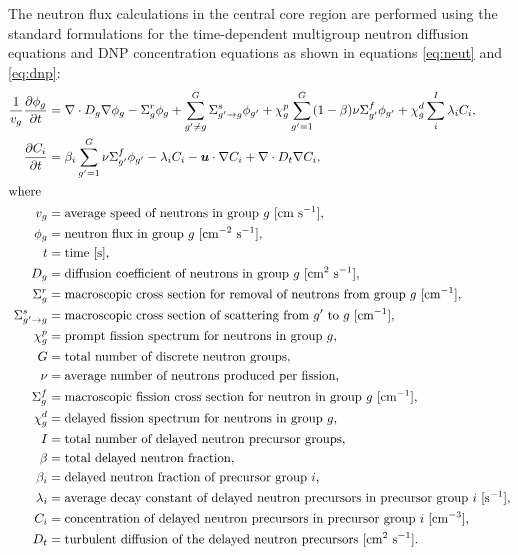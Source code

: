 The neutron flux calculations in the central core region are
performed using the standard formulations for the time-dependent multigroup
neutron diffusion equations and \gls{DNP} concentration equations as shown in
equations \ref{eq:neut} and \ref{eq:dnp}:
%
\begin{align}
    \frac{1}{v_g} \frac{\partial \phi_g}{\partial t} &= \nabla \cdot D_g
    \nabla \phi_g - \Sigma^r_g \phi_g +
    \sum^G_{g' \neq g} \Sigma^s_{g' \rightarrow g} \phi_{g'} + \chi^p_g
    \sum^G_{g'=1} (1-\beta) \nu \Sigma^f_{g'} \phi_{g'} + \chi^d_g \sum^I_i
    \lambda_i C_i, \label{eq:neut} \\
    \frac{\partial C_i}{\partial t} &= \beta_i \sum^G_{g'=1} \nu \Sigma^f_{g'}
    \phi_{g'} - \lambda_i C_i - \boldsymbol{u} \cdot \nabla C_i + \nabla \cdot
    D_t \nabla C_i, \label{eq:dnp} \\
    \intertext{where}
    v_g &= \text{average speed of neutrons in group $g$ [cm s$^{-1}$],} 
    \nonumber \\
    \phi_g &= \text{neutron flux in group $g$ [cm$^{-2}$ s$^{-1}$],} \nonumber
    \\
    t &= \text{time [s],} \nonumber \\
    D_g &= \text{diffusion coefficient of neutrons in group $g$ [cm$^2$
    s$^{-1}$],} \nonumber \\
    \Sigma^r_g &= \text{macroscopic cross section for removal of neutrons from
    group $g$ [cm$^{-1}$],} \nonumber \\
    \Sigma^s_{g' \rightarrow g} &= \text{macroscopic cross section of
    scattering from $g'$ to $g$ [cm$^{-1}$],} \nonumber \\
    \chi^p_g &= \text{prompt fission spectrum for neutrons in group $g$,}
    \nonumber \\
    G &= \text{total number of discrete neutron groups,} \nonumber \\
    \nu &= \text{average number of neutrons produced per fission,} \nonumber
    \\
    \Sigma^f_{g} &= \text{macroscopic fission cross section for neutron in
    group $g$ [cm$^{-1}$],} \nonumber \\
    \chi^d_g &= \text{delayed fission spectrum for neutrons in group $g$,}
    \nonumber \\
    I &= \text{total number of delayed neutron precursor groups,} \nonumber \\
    \beta &= \text{total delayed neutron fraction,} \nonumber \\
    \beta_i &= \text{delayed neutron fraction of precursor group $i$,}
    \nonumber \\
    \lambda_i &= \text{average decay constant of delayed neutron precursors in
    precursor group $i$ [s$^{-1}$],} \nonumber \\
    C_i &= \text{concentration of delayed neutron precursors in precursor
    group $i$ [cm$^{-3}$],} \nonumber \\
    D_t &= \text{turbulent diffusion of the delayed neutron precursors [cm$^2$
    s$^{-1}$].} \nonumber
\end{align}
%


